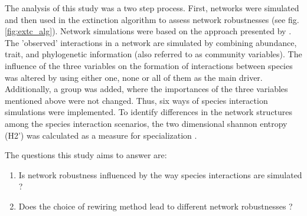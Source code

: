 \documentclass[12pt,a4paper]{article}
\begin{document}
The analysis of this study was a two step process. First, networks were simulated and then used in the extinction algorithm to assess network robustnesses (see fig. \ref{fig:extc_alg}).  
Network simulations were based on the approach presented by \citeauthor{Benadi} \parencite{Benadi}. The 'observed' interactions in a network are simulated by combining abundance, trait, and phylogenetic information (also referred to as community variables). The influence of the three variables on the formation of interactions between species was altered by using either one, none or all of them as the main driver. Additionally, a group was added, where the importances of the three variables mentioned above were not changed. Thus, six ways of species interaction simulations were implemented.
To identify differences in the network structures among the species interaction scenarios, the two dimensional shannon entropy (H2') was calculated as a measure for specialization \parencite{Blüthgen2006}.



	
The questions this study aims to answer are:
\begin{enumerate}
\item Is network robustness influenced by the way species interactions are simulated ?
\item Does the choice of rewiring method lead to different network robustnesses ?
\end{enumerate}

\end{document}
